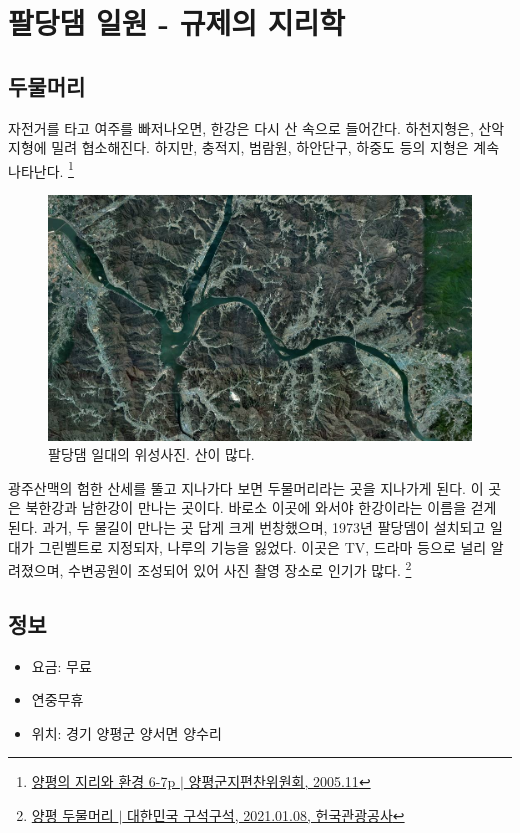 \documentclass[chapter, oneside]{oblivoir}
\begin{document}
\section{팔당댐 일원 - 규제의 지리학}
\subsection{두물머리}
자전거를 타고 여주를 빠저나오면, 한강은 다시 산 속으로 들어간다. 
하천지형은, 산악지형에 밀려 협소해진다. 하지만, 충적지, 범람원, 하안단구, 하중도 등의 지형은 계속 나타난다.
\footnote{\href{https://memory.library.kr/items/show/28910}{양평의 지리와 환경 6-7p $|$ 양평군지편찬위원회, 2005.11}}


\begin{figure}
    \centering
    \includegraphics[width=1\textwidth]{img/팔당호지도.png}
    \caption{팔당댐 일대의 위성사진. 산이 많다.\protect\footnotemark}
    \label{fig:my_label8}
\end{figure}


광주산맥의 험한 산세를 뚤고 지나가다 보면 두물머리라는 곳을 지나가게 된다. 이 곳은 북한강과 남한강이 만나는 곳이다.
바로소 이곳에 와서야 한강이라는 이름을 걷게 된다.
과거, 두 물길이 만나는 곳 답게 크게 번창했으며, 1973년 팔당뎀이 설치되고 일대가 그린벨트로 지정되자,
나루의 기능을 잃었다.
이곳은 TV, 드라마 등으로 널리 알려졌으며,
수변공원이 조성되어 있어 사진 촬영 장소로 인기가 많다.
\footnote{\href{https://terms.naver.com/entry.naver?docId=1997444&cid=42856&categoryId=42856}{양평 두물머리 $|$ 대한민국 구석구석, 2021.01.08, 헌국관광공사}}

\subsection{정보}
\begin{itemize}
    \item 요금: 무료
    \item 연중무휴
    \item 위치: 경기 양평군 양서면 양수리
\end{itemize}
\end{document}
